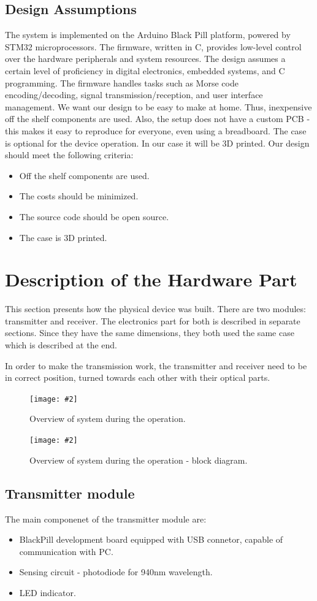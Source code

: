 \documentclass[12pt]{article}
\newcommand{\image}[3]{
\begin{figure}[h]
	\begin{center}
		\texttt{[image: \#2]}
	\end{center}
  \caption{#1}
\end{figure}}
\begin{document}
	\subsection{Design Assumptions}
  The system is implemented on the Arduino Black Pill platform, powered by STM32 microprocessors. The firmware, written in C, provides low-level control over the hardware peripherals and system resources. The design assumes a certain level of 
  proficiency in digital electronics, embedded systems, and C programming. The firmware handles tasks such as Morse code encoding/decoding, signal transmission/reception, and user interface management.
  We want our design to be easy to make at home. Thus, inexpensive off the shelf components are used.
  Also, the setup does not have a custom PCB - this makes it easy to reproduce for everyone, even using a breadboard.	
  The case is optional for the device operation. In our case it will be 3D printed.
  Our design should meet the following criteria:
  \begin{itemize}
    \item Off the shelf components are used.
    \item The costs should be minimized.
    \item The source code should be open source.
    \item The case is 3D printed.
  \end{itemize}
  
    \newpage
	\section{Description of the Hardware Part}
  This section presents how the physical device was built.
  There are two modules: transmitter and receiver. The electronics part for both is described in separate sections.
  Since they have the same dimensions, they both used the same case which is described at the end.

  In order to make the transmission work, the transmitter and receiver need to be in correct position, turned towards
  each other with their optical parts.
  \vspace{2cm}
  \image{Overview of system during the operation.}{real_diagram.png}{0.25}
  \vspace{2cm}
  \image{Overview of system during the operation - block diagram.}{both.png}{0.5}

  \newpage
  \subsection{Transmitter module}
  The main componenet of the transmitter module are:
  \begin{itemize}
    \item BlackPill development board equipped with USB connetor, capable of communication with PC.
    \item Sensing circuit - photodiode for 940nm wavelength.
    \item LED indicator.
  \end{itemize}
\end{document}
